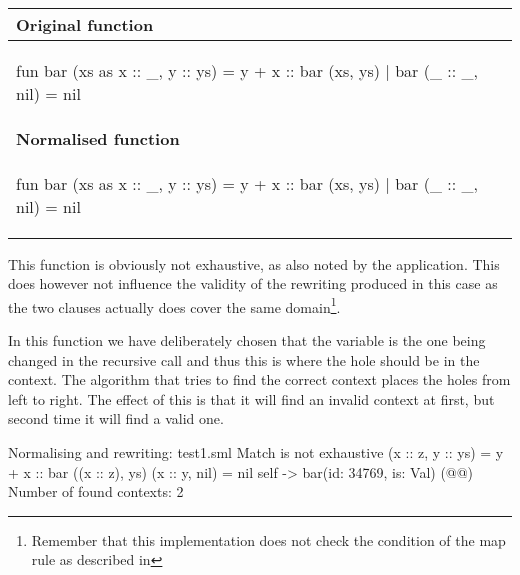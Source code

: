 \begin{example}\
  \label{ex:eval-map-rewrite-bar}\\

  \begin{center}
    \begin{tabular}{|l|}
      \hline
      \textbf{Original function}
      \\\hline
      \begin{sml}
fun bar (xs as x :: _, y :: ys) = y + x :: bar (xs, ys)
  | bar (_ :: _, nil) = nil
      \end{sml}
      \\\hline
      \textbf{Normalised function}
      \\\hline
      \begin{sml}
fun bar (xs as x :: _, y :: ys) = y + x :: bar (xs, ys)
  | bar (_ :: _, nil) = nil        
      \end{sml}
      \\\hline
    \end{tabular}
  \end{center}

  \noindent
  This function is obviously not exhaustive, as also noted by the
  \ttt{RewriteMap} application. This does however not influence the validity of
  the rewriting produced in this case as the two clauses actually does cover the
  same domain\footnote{Remember that this implementation does not check the
    \ttt{where} condition of the map rule as described in
    }.

  In this function we have deliberately chosen that the  variable is the
  one being changed in the recursive call and thus this is where the hole should
  be in the context. The algorithm that tries to find the correct context places
  the holes from left to right. The effect of this is that it will find an
  invalid context at first, but second time it will find a valid one.

  \begin{narrow}{-3em}{0em}
    \setlength{\linewidth}{1.2\linewidth}
    \footnotesize
    
    \begin{multicols}{2}           
      \begin{sml}
Normalising and rewriting: test1.sml
Match is not exhaustive
  (x :: z, y :: ys) = y + x :: bar ((x :: z), ys)
  (x :: y, nil) = nil
self -> bar(id: 34769, is: Val)
(@@)
Number of found contexts: 2


\end{sml}
\end{multicols}
\end{narrow}
\end{example}
